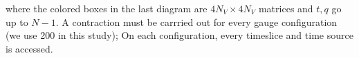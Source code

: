 where the colored boxes in the last diagram are $4N_V \times 4N_V$ matrices and $t,q$ go up to $N-1$. A contraction must be carrried out for every gauge configuration (we use 200 in this study); On each configuration, every timeslice and time source is accessed.  




